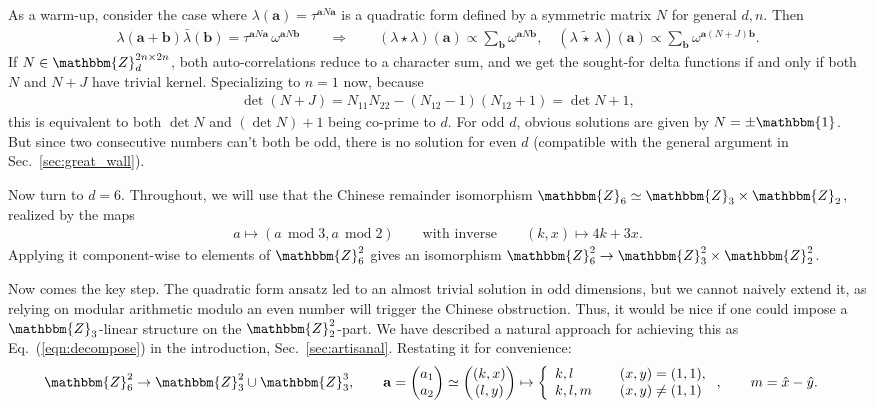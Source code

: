 \documentclass[aps,nofootinbib,floatfix,a4paper]{revtex4}
\newcommand{\1}{\mbox{$\mathbf{1}$}}
\def\ZZ{\mathbbm{Z}}
\def\Id{\mathbbm{1}}
\newcommand{\twisted}{\,\tilde\star\,}
\renewcommand{\vec}{\mathbf}
\begin{document}
As a warm-up, consider the case where $\lambda(\vec a) = \tau^{\vec a N \vec a}$ is a quadratic form defined by a symmetric matrix $N$ for general $d,n$.
Then 
\begin{align}\label{eqn:perfect_quadratic}
	\lambda({\vec a + \vec b}) \bar\lambda({\vec b})
	=
	\tau^{\vec a N \vec a}
	\,
	\omega^{\vec a N \vec b}
	\qquad
	\Rightarrow
	\qquad
	(\lambda \star \lambda)(\vec a)
	\propto \sum_{\vec b} \omega^{\vec a N \vec b},
	\quad
	(\lambda \twisted \lambda)(\vec a)
	\propto 
	\sum_{\vec b} 
	\omega^{\vec a (N+J) \vec b}
	.
\end{align}
If $N\in\ZZ_d^{2n\times 2n}$, both auto-correlations reduce to a character sum, and we get the sought-for delta functions if and only if both $N$ and $N+J$ have trivial kernel.
Specializing to $n=1$ now, because
\begin{align*}
	\det (N+J) 
	= 
	N_{11} N_{22} - (N_{12}-1)(N_{12}+1)
	=
	\det N
	+1,
\end{align*}
this is equivalent to both $\det N$ and $(\det N)+1$ being co-prime to $d$.
For odd $d$, obvious solutions are given by $N=\pm\Id$.
But since two consecutive numbers can't both be odd, there is no solution for even $d$ (compatible with the general argument in Sec.~\ref{sec:great_wall}).

Now turn to $d=6$.
Throughout, we will use that the Chinese remainder isomorphism $\ZZ_6\simeq \ZZ_3 \times \ZZ_2$, realized by the maps
\begin{align}\label{eqn:cr_with_inverse}
	a \mapsto (a\,\operatorname{mod}3, a\,\operatorname{mod}2)
	\qquad\text{with inverse}\qquad
	(k,x) \mapsto 4k + 3 x.
\end{align}
Applying it component-wise to elements of $\ZZ_6^2$ gives an isomorphism $\ZZ_6^2 \to \ZZ_3^2 \times \ZZ_2^2$.

Now comes the key step.
The quadratic form ansatz led to an almost trivial solution in odd dimensions,
but we cannot naively extend it, as relying on modular arithmetic modulo an even number will trigger the Chinese obstruction.
Thus, it would be nice if one could impose a $\ZZ_3$-linear structure on the $\ZZ_2^2$-part.
We have described a natural approach for achieving this as Eq.~(\ref{eqn:decompose}) in the introduction, Sec.~\ref{sec:artisanal}.
Restating it for convenience:
\begin{align*}
	\ZZ_6^2
	\to
	\ZZ_3^2 \cup \ZZ_3^3,
	\qquad	
	\vec a
	=
	\begin{pmatrix}
		a_1\\
		a_2
	\end{pmatrix}
	\simeq
	\begin{pmatrix}
		(k,x)\\
		(l,y)\\
	\end{pmatrix}
	&\mapsto
	\left\{
		\begin{array}{ll}
			k,l & (x,y) = (1,1), \\
			k,l,m\quad & (x,y)\neq (1,1)
		\end{array}
	\right.,
	\qquad
	m= \hat x-\hat y .
\end{align*}
\end{document}
